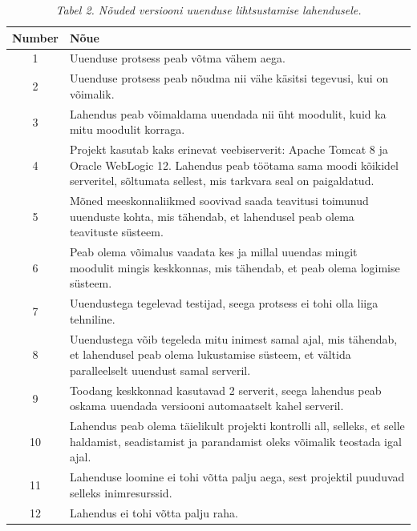 \documentclass[12pt]{report}
\begin{document}
  \begin{table}
    \caption*{\textit{Tabel 2. Nõuded versiooni uuenduse lihtsustamise lahendusele.}}
    
    \begin{tabular}{|c|p{11cm}|}
      \hline
      \textbf{Number} & \textbf{Nõue}\\
      \hline
      1 & Uuenduse protsess peab võtma vähem aega.\\
      \hline
      2 & Uuenduse protsess peab nõudma nii vähe käsitsi tegevusi, kui on võimalik.\\
      \hline
      3 & Lahendus peab võimaldama uuendada nii üht moodulit, kuid ka mitu moodulit korraga.\\
      \hline
      4 & Projekt kasutab kaks erinevat veebiserverit: Apache Tomcat 8 ja Oracle WebLogic 12. Lahendus peab töötama sama moodi kõikidel serveritel, sõltumata sellest, mis tarkvara seal on paigaldatud.\\
      \hline
      5 & Mõned meeskonnaliikmed soovivad saada teavitusi toimunud uuenduste kohta, mis tähendab, et lahendusel peab olema teavituste süsteem.\\
      \hline
      6 & Peab olema võimalus vaadata kes ja millal uuendas mingit moodulit mingis keskkonnas, mis tähendab, et peab olema logimise süsteem.\\
      \hline
      7 & Uuendustega tegelevad testijad, seega protsess ei tohi olla liiga tehniline.\\
      \hline
      8 & Uuendustega võib tegeleda mitu inimest samal ajal, mis tähendab, et lahendusel peab olema lukustamise süsteem, et vältida paralleelselt uuendust samal serveril.\\
      \hline
      9 & Toodang keskkonnad kasutavad 2 serverit, seega lahendus peab oskama uuendada versiooni automaatselt kahel serveril.\\
      \hline
      10 & Lahendus peab olema täielikult projekti kontrolli all, selleks, et selle haldamist, seadistamist ja parandamist oleks võimalik teostada igal ajal.\\
      \hline
      11 & Lahenduse loomine ei tohi võtta palju aega, sest projektil puuduvad selleks inimresurssid.\\
      \hline
      12 & Lahendus ei tohi võtta palju raha.\\
      \hline
    \end{tabular}
  \end{table}
  
  \newpage
  
\end{document}

